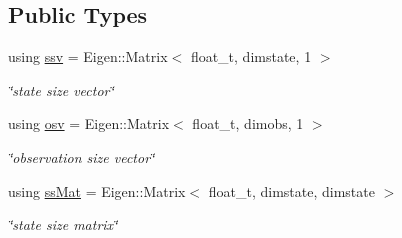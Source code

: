 \subsection*{Public Types}
\begin{DoxyCompactItemize}
\item 
\mbox{\label{classhmm_ae13f52a15dc738d07c43be7f7545d26a}} 
using \hyperlink{classhmm_ae13f52a15dc738d07c43be7f7545d26a}{ssv} = Eigen\+::\+Matrix$<$ float\+\_\+t, dimstate, 1 $>$
\begin{DoxyCompactList}\small\item\em \char`\"{}state size vector\char`\"{} \end{DoxyCompactList}\item 
\mbox{\label{classhmm_a9acf2492ac9dd051d4c98dc137bee7c2}} 
using \hyperlink{classhmm_a9acf2492ac9dd051d4c98dc137bee7c2}{osv} = Eigen\+::\+Matrix$<$ float\+\_\+t, dimobs, 1 $>$
\begin{DoxyCompactList}\small\item\em \char`\"{}observation size vector\char`\"{} \end{DoxyCompactList}\item 
\mbox{\label{classhmm_ab954b8e3fc86a60201ec33f371a241aa}} 
using \hyperlink{classhmm_ab954b8e3fc86a60201ec33f371a241aa}{ss\+Mat} = Eigen\+::\+Matrix$<$ float\+\_\+t, dimstate, dimstate $>$
\begin{DoxyCompactList}\small\item\em \char`\"{}state size matrix\char`\"{} \end{DoxyCompactList}\end{DoxyCompactItemize}
